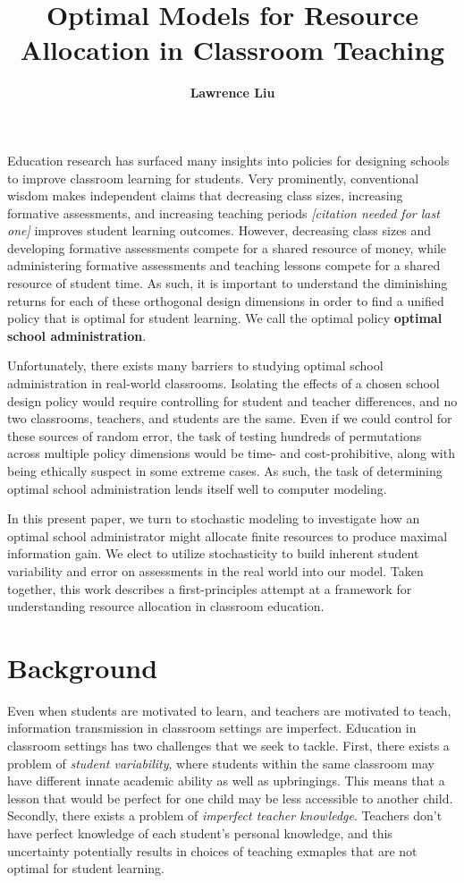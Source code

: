 \documentclass[10pt, letterpaper]{apa6}
\date{}
\title{\textbf{Optimal Models for Resource Allocation in Classroom Teaching}}
\author{\large \bf Lawrence Liu}
\begin{document}
\maketitle

Education research has surfaced many insights into policies for
designing schools to improve classroom learning for students. Very
prominently, conventional wisdom makes independent claims that
decreasing class sizes, increasing formative assessments, and increasing
teaching periods \emph{{[}citation needed for last one{]}} improves
student learning outcomes. However, decreasing class sizes and
developing formative assessments compete for a shared resource of money,
while administering formative assessments and teaching lessons compete
for a shared resource of student time. As such, it is important to
understand the diminishing returns for each of these orthogonal design
dimensions in order to find a unified policy that is optimal for student
learning. We call the optimal policy \textbf{optimal school
administration}.

Unfortunately, there exists many barriers to studying optimal school
administration in real-world classrooms. Isolating the effects of a
chosen school design policy would require controlling for student and
teacher differences, and no two classrooms, teachers, and students are
the same. Even if we could control for these sources of random error,
the task of testing hundreds of permutations across multiple policy
dimensions would be time- and cost-prohibitive, along with being
ethically suspect in some extreme cases. As such, the task of
determining optimal school administration lends itself well to computer
modeling.

In this present paper, we turn to stochastic modeling to investigate how
an optimal school administrator might allocate finite resources to
produce maximal information gain. We elect to utilize stochasticity to
build inherent student variability and error on assessments in the real
world into our model. Taken together, this work describes a
first-principles attempt at a framework for understanding resource
allocation in classroom education.

\section{Background}\label{background}

Even when students are motivated to learn, and teachers are motivated to
teach, information transmission in classroom settings are imperfect.
Education in classroom settings has two challenges that we seek to
tackle. First, there exists a problem of \emph{student variability},
where students within the same classroom may have different innate
academic ability as well as upbringings. This means that a lesson that
would be perfect for one child may be less accessible to another child.
Secondly, there exists a problem of \emph{imperfect teacher knowledge}.
Teachers don't have perfect knowledge of each student's personal
knowledge, and this uncertainty potentially results in choices of
teaching exmaples that are not optimal for student learning.
\end{document}
